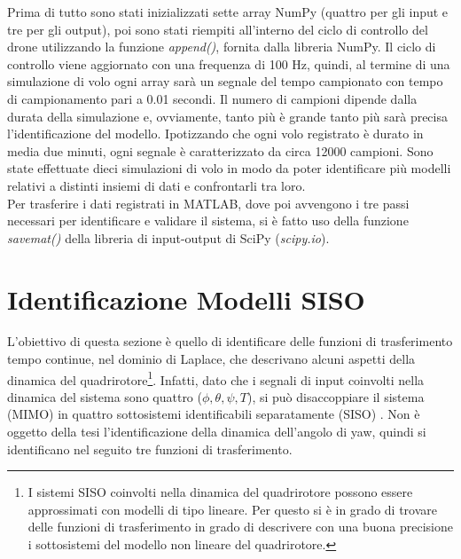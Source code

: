 Prima di tutto sono stati inizializzati sette array NumPy (quattro per gli input e tre per gli output), poi sono stati riempiti all'interno del ciclo di controllo del drone utilizzando la funzione \emph{append()}, fornita dalla libreria NumPy. Il ciclo di controllo viene aggiornato con una frequenza di 100 Hz, quindi, al termine di una simulazione di volo ogni array sarà un segnale del tempo campionato con tempo di campionamento pari a 0.01 secondi. Il numero di campioni dipende dalla durata della simulazione e, ovviamente, tanto più è grande tanto più sarà precisa l'identificazione del modello. Ipotizzando che ogni volo registrato è durato in media due minuti, ogni segnale è caratterizzato da circa 12000 campioni. Sono state effettuate dieci simulazioni di volo in modo da poter identificare più modelli relativi a distinti insiemi di dati e confrontarli tra loro.\\

Per trasferire i dati registrati in MATLAB, dove poi avvengono i tre passi necessari per identificare e validare il sistema, si è fatto uso della funzione \emph{savemat()} \cite{savemat} della libreria di input-output di SciPy (\emph{scipy.io}).


\section{Identificazione Modelli SISO}
L'obiettivo di questa sezione è quello di identificare delle funzioni di trasferimento tempo continue, nel dominio di Laplace, che descrivano alcuni aspetti della dinamica del quadrirotore\footnote{I sistemi \acs{SISO} coinvolti nella dinamica del quadrirotore possono essere approssimati con modelli di tipo lineare. Per questo si è in grado di trovare delle funzioni di trasferimento in grado di descrivere con una buona precisione i sottosistemi del modello non lineare del quadrirotore.}. Infatti, dato che i segnali di input coinvolti nella dinamica del sistema sono quattro ($\phi, \theta, \psi, T$), si può disaccoppiare il sistema (\acs{MIMO}) in quattro sottosistemi identificabili separatamente (\acs{SISO}) \cite{decoupledDynamics}. Non è oggetto della tesi l'identificazione della dinamica dell'angolo di yaw, quindi si identificano nel seguito tre funzioni di trasferimento.

